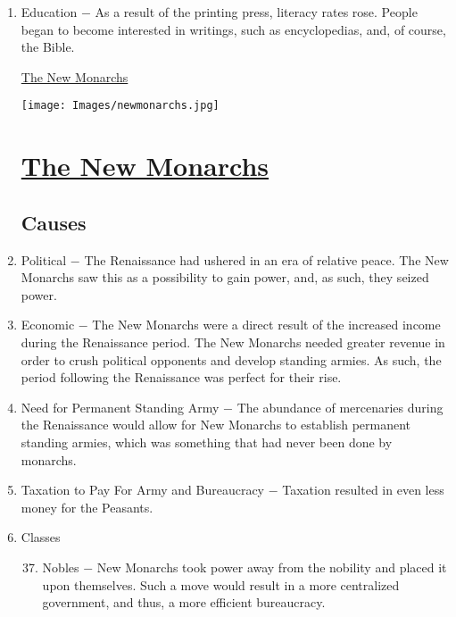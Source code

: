 \documentclass[12pt]{article}
\begin{document}
\begin{enumerate}
\item Education $-$ As a result of the printing press, literacy rates rose. People began to become interested in writings, such as encyclopedias, and, of course, the Bible.

\newpage
\begin{center}
\end{center}
\begin{center}
\end{center}
\begin{center}
\underline{\Huge The New Monarchs}
\end{center}
\vspace{50pt}
\texttt{[image: Images/newmonarchs.jpg]}
\newpage


\begin{center}
\section{\underline{The New Monarchs}}
\end{center}

\subsection{Causes}

\item Political $-$ The Renaissance had ushered in an era of relative peace. The New Monarchs saw this as a possibility to gain power, and, as such, they seized power.

\item Economic $-$ The New Monarchs were a direct result of the increased income during the Renaissance period. The New Monarchs needed greater revenue in order to crush political opponents and develop standing armies. As such, the period following the Renaissance was perfect for their rise.

\item Need for Permanent Standing Army $-$ The abundance of mercenaries during the Renaissance would allow for New Monarchs to establish permanent standing armies, which was something that had never been done by monarchs.

\item Taxation to Pay For Army and Bureaucracy $-$ Taxation resulted in even less money for the Peasants.

\item Classes
\begin{enumerate}[label=\arabic{*}.]
\setcounter{enumii}{36}
\item Nobles $-$ New Monarchs took power away from the nobility and placed it upon themselves. Such a move would result in a more centralized government, and thus, a more efficient bureaucracy.


\end{enumerate}
\end{enumerate}
\end{document}
